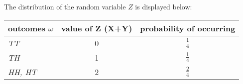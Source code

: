 \documentclass[11pt]{article}
\begin{document}
\begin{solution}
\begin{Parts}
\Part The distribution of the random variable $Z$ is displayed below:

\begin{center}
    \begin{tabular}{|>{\centering\arraybackslash}m{6cm}|c|c|}
    \hline
    \textbf{outcomes $\omega$} & \textbf{value of Z (X+Y)} & 
    \textbf{probability of occurring} \\
    \hline
    \textit{TT} & 0 & $\frac{1}{4}$ \\
    \hline
    \textit{TH} & 1 & $\frac{1}{4}$ \\
    \hline
    \textit{HH, HT} & 2 & $\frac{2}{4}$ \\
    \hline
    \end{tabular}
\end{center}



\end{Parts}

\end{solution}

\end{document}
